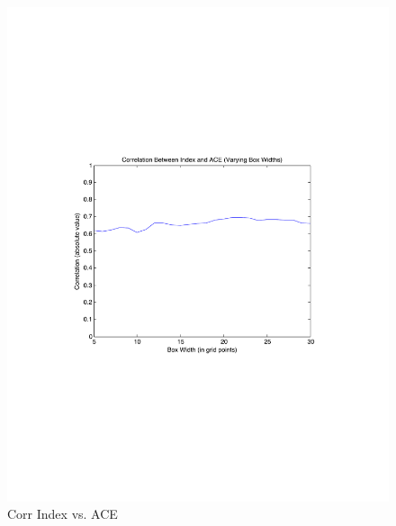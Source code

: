\documentclass[]{article}
\begin{document}
\begin{figure}[ht]
\begin{minipage}[b]{0.6\linewidth}
\includegraphics[width=\textwidth]{figures/sensitivityResults/boxSize/ACE_Index_Box_Size.pdf}
\caption{Corr Index vs. ACE}
\label{fig:figure1}
\end{minipage}
\hspace{0cm}
\begin{minipage}[b]{0.6\linewidth}

\end{minipage}
\end{figure}
\end{document}
